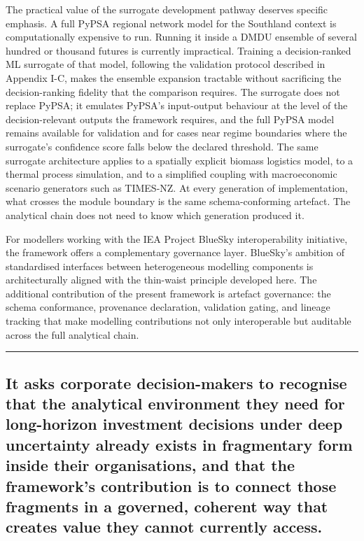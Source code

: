 \documentclass[
  11pt,
  a4paper,
  twoside,
  openright]{scrbook}
\begin{document}
The practical value of the surrogate development pathway deserves
specific emphasis. A full PyPSA regional network model for the Southland
context is computationally expensive to run. Running it inside a DMDU
ensemble of several hundred or thousand futures is currently
impractical. Training a decision-ranked ML surrogate of that model,
following the validation protocol described in Appendix I-C, makes the
ensemble expansion tractable without sacrificing the decision-ranking
fidelity that the comparison requires. The surrogate does not replace
PyPSA; it emulates PyPSA's input-output behaviour at the level of the
decision-relevant outputs the framework requires, and the full PyPSA
model remains available for validation and for cases near regime
boundaries where the surrogate's confidence score falls below the
declared threshold. The same surrogate architecture applies to a
spatially explicit biomass logistics model, to a thermal process
simulation, and to a simplified coupling with macroeconomic scenario
generators such as TIMES-NZ. At every generation of implementation, what
crosses the module boundary is the same schema-conforming artefact. The
analytical chain does not need to know which generation produced it.

For modellers working with the IEA Project BlueSky interoperability
initiative, the framework offers a complementary governance layer.
BlueSky's ambition of standardised interfaces between heterogeneous
modelling components is architecturally aligned with the thin-waist
principle developed here. The additional contribution of the present
framework is artefact governance: the schema conformance, provenance
declaration, validation gating, and lineage tracking that make modelling
contributions not only interoperable but auditable across the full
analytical chain.

\begin{center}\rule{0.5\linewidth}{0.5pt}\end{center}

\subsection{It asks corporate decision-makers to recognise that the
analytical environment they need for long-horizon investment decisions
under deep uncertainty already exists in fragmentary form inside their
organisations, and that the framework's contribution is to connect those
fragments in a governed, coherent way that creates value they cannot
currently
access.}\label{it-asks-corporate-decision-makers-to-recognise-that-the-analytical-environment-they-need-for-long-horizon-investment-decisions-under-deep-uncertainty-already-exists-in-fragmentary-form-inside-their-organisations-and-that-the-frameworks-contribution-is-to-connect-those-fragments-in-a-governed-coherent-way-that-creates-value-they-cannot-currently-access.}
\end{document}

